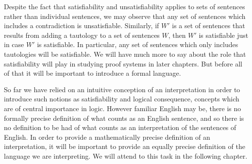 Despite the fact that satisfiability and unsatisfiability applies to sets of sentences rather than individual sentences, we may observe that any set of sentences which includes a contradiction is unsatisfiable.
Similarly, if $W'$ is a set of sentences that results from adding a tautology to a set of sentences $W$, then $W'$ is satisfiable just in case $W'$ is satisfiable. 
In particular, any set of sentences which only includes tautologies will be satisfiable.
We will have much more to say about the role that satisfiability will play in studying proof systems in later chapters.
But before all of that it will be important to introduce a formal language.

So far we have relied on an intuitive conception of an interpretation in order to introduce such notions as satisfiability and logical consequence, concepts which are of central importance in logic.
However familiar English may be, there is no formally precise definition of what counts as an English sentence, and so there is no definition to be had of what counts as an interpretation of the sentences of English.
In order to provide a mathematically precise definition of an interpretation, it will be important to provide an equally precise definition of the language we are interpreting.
We will attend to this task in the following chapter.


%
%


